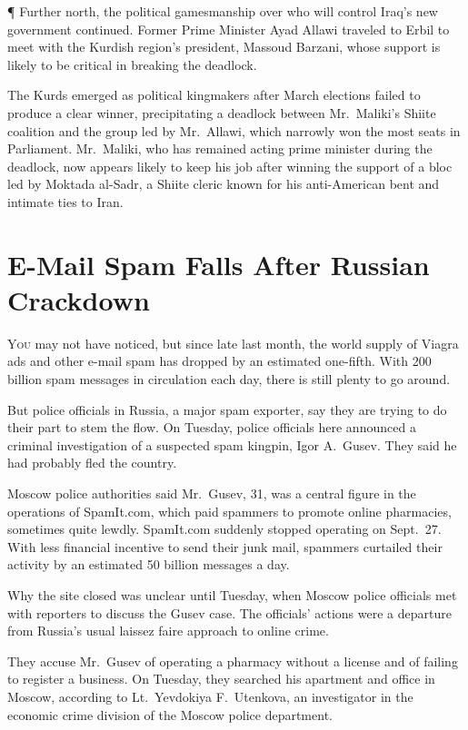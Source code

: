 ﻿\documentclass[12pt]{article}
\begin{document}
¶ Further north, the political gamesmanship over who will control Iraq's new government continued.
Former Prime Minister Ayad Allawi traveled to Erbil to meet with the Kurdish region's president,
Massoud Barzani, whose support is likely to be critical in breaking the deadlock.

The Kurds emerged as political kingmakers after March elections failed to produce a clear winner,
precipitating a deadlock between Mr.~Maliki's Shiite coalition and the group led by Mr.~Allawi,
which narrowly won the most seats in Parliament. Mr.~Maliki, who has remained acting prime minister
during the deadlock, now appears likely to keep his job after winning the support of a bloc led by
Moktada al-Sadr, a Shiite cleric known for his anti-American bent and intimate ties to Iran.

\section{E-Mail Spam Falls After Russian Crackdown}

\lettrine{Y}{ou} may not have noticed, but since late last month, the world
supply of Viagra ads and other e-mail spam has dropped by an estimated one-fifth. With 200 billion
spam messages in circulation each day, there is still plenty to go around.

But police officials in Russia, a major spam exporter, say they are trying to do their part to stem
the flow. On Tuesday, police officials here announced a criminal investigation of a suspected spam
kingpin, Igor A.~Gusev. They said he had probably fled the country.

Moscow police authorities said Mr.~Gusev, 31, was a central figure in the operations of SpamIt.com,
which paid spammers to promote online pharmacies, sometimes quite lewdly. SpamIt.com suddenly
stopped operating on Sept.~27. With less financial incentive to send their junk mail, spammers
curtailed their activity by an estimated 50 billion messages a day.

Why the site closed was unclear until Tuesday, when Moscow police officials met with reporters to
discuss the Gusev case. The officials' actions were a departure from Russia's usual laissez faire
approach to online crime.

They accuse Mr.~Gusev of operating a pharmacy without a license and of failing to register a
business. On Tuesday, they searched his apartment and office in Moscow, according to Lt.~Yevdokiya
F.~Utenkova, an investigator in the economic crime division of the Moscow police department.
\end{document}
